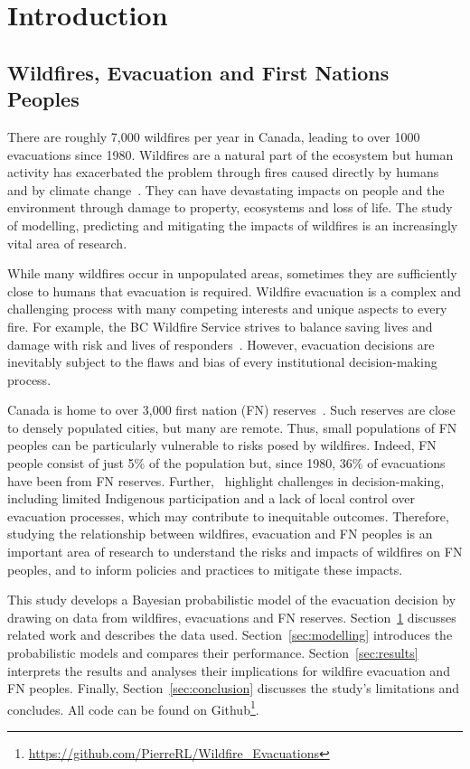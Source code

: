 \section{Introduction}\label{sec:introduction}
\subsection{Wildfires, Evacuation and First Nations Peoples}\label{sec:wildfires_and_evacuation}

There are roughly 7,000 wildfires per year in Canada, leading to over 1000 evacuations since 1980. Wildfires are a natural part of the ecosystem but human activity has exacerbated the problem through fires caused directly by humans and by climate change~\citep{cwfis_summary}. They can have devastating impacts on people and the environment through damage to property, ecosystems and loss of life. The study of modelling, predicting and mitigating the impacts of wildfires is an increasingly vital area of research.

While many wildfires occur in unpopulated areas, sometimes they are sufficiently close to humans that evacuation is required. Wildfire evacuation is a complex and challenging process with many competing interests and unique aspects to every fire. For example, the BC Wildfire Service strives to balance saving lives and damage with risk and lives of responders~\citep{bcgov_evacuation_process}. However, evacuation decisions are inevitably subject to the flaws and bias of every institutional decision-making process. 

Canada is home to over 3,000 first nation (FN) reserves~\citep{reservesdb}. Such reserves are close to densely populated cities, but many are remote. Thus, small populations of FN peoples can be particularly vulnerable to risks posed by wildfires. Indeed, FN people consist of just 5\% of the population but, since 1980, 36\% of evacuations have been from FN reserves. Further,~\citet{management_evacuation_review} highlight challenges in decision-making, including limited Indigenous participation and a lack of local control over evacuation processes, which may contribute to inequitable outcomes. Therefore, studying the relationship between wildfires, evacuation and FN peoples is an important area of research to understand the risks and impacts of wildfires on FN peoples, and to inform policies and practices to mitigate these impacts.

This study develops a Bayesian probabilistic model of the evacuation decision by drawing on data from wildfires, evacuations and FN reserves. Section~\ref{sec:introduction} discusses related work and describes the data used. Section~\ref{sec:modelling} introduces the probabilistic models and compares their performance. Section~\ref{sec:results} interprets the results and analyses their implications for wildfire evacuation and FN peoples. Finally, Section~\ref{sec:conclusion} discusses the study's limitations and concludes. All code can be found on Github\footnote{\url{https://github.com/PierreRL/Wildfire_Evacuations}}.

